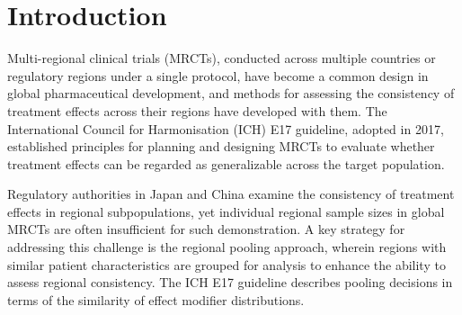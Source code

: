 \documentclass[AMA,Times1COL]{WileyNJDv5}
\begin{document}

\maketitle

\renewcommand\thefootnote{}

\renewcommand\thefootnote{\fnsymbol{footnote}}
\setcounter{footnote}{1}

\section{Introduction}\label{sec:intro}

Multi-regional clinical trials (MRCTs), conducted across multiple countries or regulatory regions under a single protocol, have become a common design in global pharmaceutical development, and methods for assessing the consistency of treatment effects across their regions have developed with them.\cite{chen2010,quan2010} The International Council for Harmonisation (ICH) E17 guideline, adopted in 2017, established principles for planning and designing MRCTs to evaluate whether treatment effects can be regarded as generalizable across the target population.\cite{iche17}

Regulatory authorities in Japan and China examine the consistency of treatment effects in regional subpopulations,\cite{matsushima2024,song2025} yet individual regional sample sizes in global MRCTs are often insufficient for such demonstration. A key strategy for addressing this challenge is the regional pooling approach, wherein regions with similar patient characteristics are grouped for analysis to enhance the ability to assess regional consistency.\cite{iche17} The ICH E17 guideline describes pooling decisions in terms of the similarity of effect modifier distributions.\cite{iche17}
\end{document}
